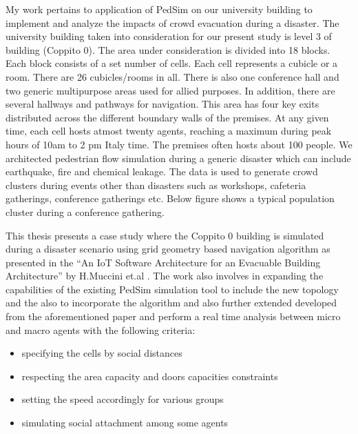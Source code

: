 My work pertains to application of PedSim on our university building to implement and analyze the impacts of crowd evacuation during a disaster. The university building taken into consideration for our present study is level 3 of building (Coppito 0). The area under consideration is divided into 18 blocks. Each block consists of a set number of cells. Each cell represents a cubicle or a room. There are 26 cubicles/rooms in all. There is also one conference hall and two generic multipurpose areas used for allied purposes. In addition, there are several hallways and pathways for navigation. This area has four key exits distributed across the different boundary walls of the premises. At any given time, each cell hosts atmost twenty agents, reaching a maximum during peak hours of 10am to 2 pm Italy time. The premises often hosts about 100 people. We architected pedestrian flow simulation during a generic disaster which can include earthquake, fire and chemical leakage. The data is used to generate crowd clusters during events other than disasters such as workshops, cafeteria gatherings, conference gatherings etc. Below figure shows a typical population cluster during a conference gathering. 

This thesis presents a case study where the Coppito 0 building is simulated during a disaster scenario using grid geometry based navigation algorithm as presented in the “An IoT Software Architecture for an Evacuable Building Architecture” by H.Muccini et.al \cite{ref5}. The work also involves in expanding the capabilities of the existing PedSim simulation tool to include the new topology and the also to incorporate the algorithm and also further extended developed from the aforementioned paper and perform a real time analysis between micro and macro agents with the following criteria:

\begin{itemize}
  \item specifying the cells by social distances
  \item respecting the area capacity and doors capacities constraints
  \item setting the speed accordingly for various groups
  \item simulating social attachment among some agents 
\end{itemize}

